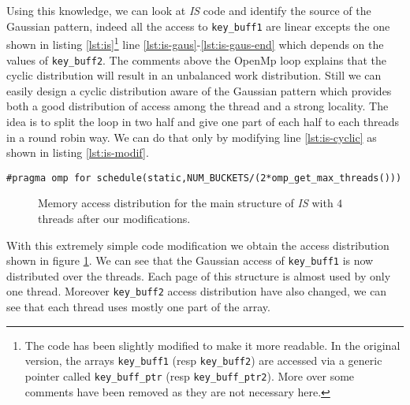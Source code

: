 Using this knowledge, we can look at \emph{IS} code and identify the source of the
Gaussian pattern, indeed all the access to \texttt{key\_buff1} are linear
excepts the one shown in listing \ref{lst:is}\footnote{
    The code has been slightly modified to make it more readable. In the
    original version, the arrays \texttt{key\_buff1} (resp \texttt{key\_buff2})
    are accessed via a generic pointer called \texttt{key\_buff\_ptr} (resp
    \texttt{key\_buff\_ptr2}). More over some comments have been removed as
    they are not necessary here.
}  line \ref{lst:is-gaus}-\ref{lst:is-gaus-end} which depends on the values of
\texttt{key\_buff2}. The comments above the OpenMp loop explains that the
cyclic distribution will result in an unbalanced work distribution. Still we can easily design a cyclic
distribution aware of the Gaussian pattern which provides both a good
distribution of access among the thread and a strong locality. The idea is to
split the loop in two half and give one part of each half to each threads in a
round robin way. We can do that only by modifying line \ref{lst:is-cyclic} as
shown in listing \ref{lst:is-modif}.
\begin{lstlisting}[caption=One line optimization for \emph{IS}, label=lst:is-modif]
#pragma omp for schedule(static,NUM_BUCKETS/(2*omp_get_max_threads()))
\end{lstlisting}

\begin{figure}[htb]
    \centering


    \caption{Memory access distribution for the main structure of
        \emph{IS} with $4$ threads after our modifications.}
    \label{fig:is-behaviour-modif}
\end{figure}

With this extremely simple code modification we obtain the access distribution
shown in figure \ref{fig:is-behaviour-modif}. We can see that the Gaussian
access of \texttt{key\_buff1} is now distributed over the threads. Each page
of this structure is almost used by only one thread. Moreover
\texttt{key\_buff2} access distribution have also changed, we can see that
each thread uses mostly one part of the array.

